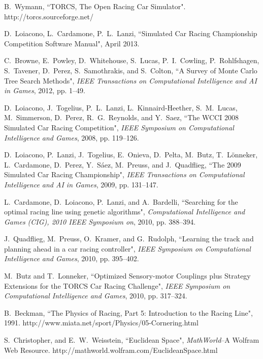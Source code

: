 \documentclass[conference]{IEEEtran}
\begin{document}
\begin{thebibliography}{18}
B.~Wymann, ``TORCS, The Open Racing Car Simulator". http://torcs.sourceforge.net/

D.~Loiacono, L.~Cardamone, P.~L.~Lanzi, ``Simulated Car Racing Championship Competition Software Manual", April 2013.

C.~Browne, E.~Powley, D.~Whitehouse, S.~Lucas, P.~I.~Cowling, P.~Rohlfshagen, S.~Tavener, D.~Perez, S.~Samothrakis, and S.~Colton, ``A Survey of Monte Carlo Tree Search Methods", \emph{IEEE Transactions on Computational Intelligence and AI in Games}, 2012, pp. 1--49.

D.~Loiacono, J.~Togelius, P.~L.~Lanzi, L.~Kinnaird-Heether, S.~M.~Lucas, M.~Simmerson, D.~Perez, R.~G.~Reynolds, and Y.~Saez, ``The WCCI 2008 Simulated Car Racing Competition", \emph{IEEE Symposium on Computational Intelligence and Games}, 2008, pp. 119--126.

D.~Loiacono, P.~Lanzi, J.~Togelius, E.~Onieva, D.~Pelta, M.~Butz, T.~Lönneker, L.~Cardamone, D.~Perez, Y.~Sáez, M.~Preuss, and J.~Quadflieg, ``The 2009 Simulated Car Racing Championship", \emph{IEEE Transactions on Computational Intelligence and AI in Games}, 2009, pp. 131--147.

L.~Cardamone, D.~Loiacono, P.~Lanzi, and A.~Bardelli, ``Searching for the optimal racing line using genetic algorithms", \emph{Computational Intelligence and Games (CIG), 2010 IEEE Symposium on}, 2010, pp. 388--394.

J.~Quadflieg, M.~Preuss, O.~Kramer, and G.~Rudolph, ``Learning the track and planning ahead in a car racing controller", \emph{IEEE Symposium on Computational Intelligence and Games}, 2010, pp. 395--402.

M.~Butz and T.~Lonneker, ``Optimized Sensory-motor Couplings plus Strategy Extensions for the TORCS Car Racing Challenge", \emph{IEEE Symposium on Computational Intelligence and Games}, 2010, pp. 317--324.

B.~Beckman, ``The Physics of Racing, Part 5: Introduction to the Racing Line", 1991. http://www.miata.net/sport/Physics/05-Cornering.html

S.~Christopher, and E.~W.~Weisstein, ``Euclidean Space", \emph{MathWorld}--A Wolfram Web Resource. http://mathworld.wolfram.com/EuclideanSpace.html


\end{thebibliography}
\end{document}

